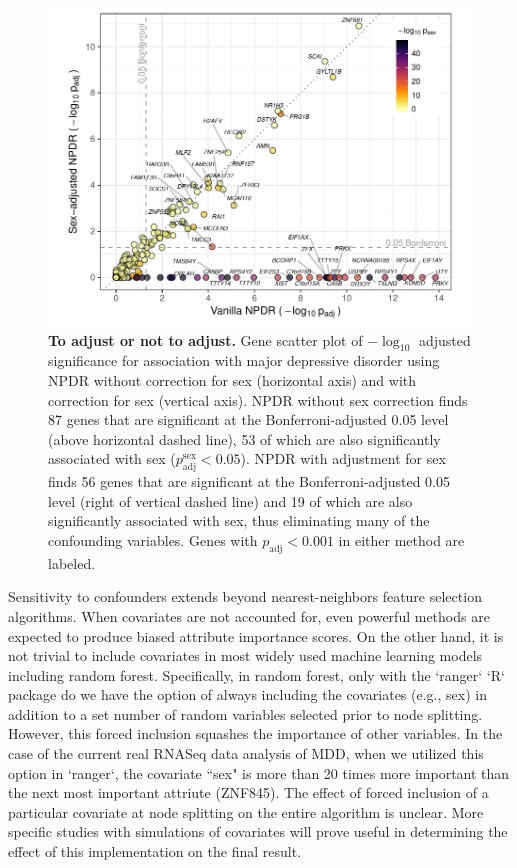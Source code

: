 \documentclass[10pt]{article}
\begin{document}
\begin{figure}[!tpb]%
\centerline{\includegraphics[]{../figs/mostafavi_npdrs_mdd.pdf}}
\caption{{\bf To adjust or not to adjust.}
Gene scatter plot of $-\log_{10}$ adjusted significance for association with major depressive disorder using NPDR without correction for sex (horizontal axis) and with correction for sex (vertical axis). NPDR without sex correction finds 87 genes that are significant at the Bonferroni-adjusted 0.05 level (above horizontal dashed line), 53 of which are also significantly associated with sex ($p^\textrm{sex}_\textrm{adj} < 0.05$).  NPDR with adjustment for sex finds 56 genes that are significant at the Bonferroni-adjusted 0.05 level (right of vertical dashed line) and 19 of which are also significantly associated with sex, thus eliminating many of the confounding variables. Genes with $p_\textrm{adj} < 0.001$ in either method are labeled.}
\label{fig:npdrs_mdd}
\end{figure}

Sensitivity to confounders extends beyond nearest-neighbors feature selection algorithms.
When covariates are not accounted for, even powerful methods are expected to produce biased attribute importance scores.
On the other hand, it is not trivial to include covariates in most widely used machine learning models including random forest.
Specifically, in random forest, only with the `ranger` `R` package do we have the option of always including the covariates (e.g., sex) in addition to a set number of random variables selected prior to node splitting.
However, this forced inclusion squashes the importance of other variables.
In the case of the current real RNASeq data analysis of MDD, when we utilized this option in `ranger`, the covariate ``sex" is more than 20 times more important than the next most important attriute (ZNF845).
The effect of forced inclusion of a particular covariate at node splitting on the entire algorithm is unclear.
More specific studies with simulations of covariates will prove useful in determining the effect of this implementation on the final result.
\end{document}
